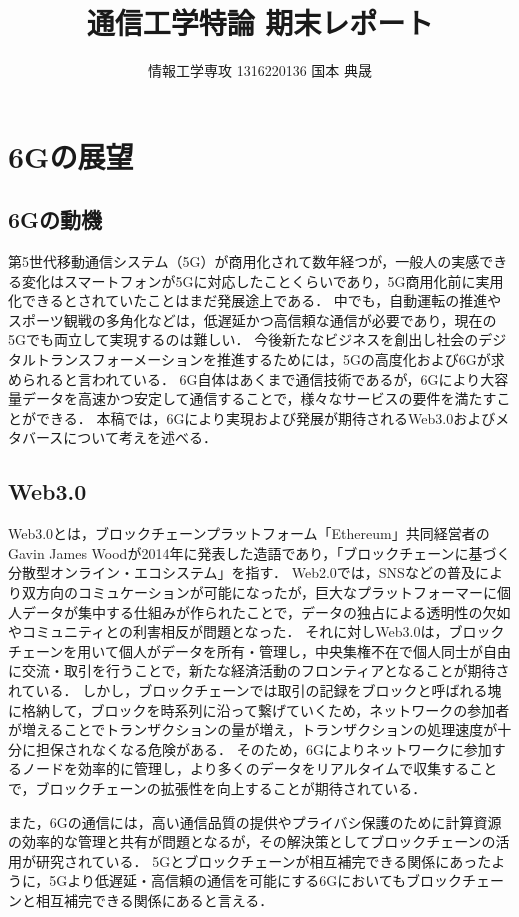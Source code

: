 \documentclass[a4paper,10pt,uplatex]{jsarticle}
\title{通信工学特論 期末レポート}
\author{情報工学専攻 1316220136 国本 典晟}
\date{}
\begin{document}
\maketitle

\section{6Gの展望}
\subsection{6Gの動機}
第5世代移動通信システム（5G）が商用化されて数年経つが，一般人の実感できる変化はスマートフォンが5Gに対応したことくらいであり，5G商用化前に実用化できるとされていたことはまだ発展途上である．
中でも，自動運転の推進やスポーツ観戦の多角化などは，低遅延かつ高信頼な通信が必要であり，現在の5Gでも両立して実現するのは難しい．
今後新たなビジネスを創出し社会のデジタルトランスフォーメーションを推進するためには，5Gの高度化および6Gが求められると言われている\cite{ドコモ,KDDI}．
6G自体はあくまで通信技術であるが，6Gにより大容量データを高速かつ安定して通信することで，様々なサービスの要件を満たすことができる．
本稿では，6Gにより実現および発展が期待されるWeb3.0およびメタバースについて考えを述べる．

\subsection{Web3.0}
Web3.0とは，ブロックチェーンプラットフォーム「Ethereum」共同経営者のGavin James Woodが2014年に発表した造語であり，「ブロックチェーンに基づく分散型オンライン・エコシステム」を指す\cite{Web3.0}．
Web2.0では，SNSなどの普及により双方向のコミュケーションが可能になったが，巨大なプラットフォーマーに個人データが集中する仕組みが作られたことで，データの独占による透明性の欠如やコミュニティとの利害相反が問題となった．
それに対しWeb3.0は，ブロックチェーンを用いて個人がデータを所有・管理し，中央集権不在で個人同士が自由に交流・取引を行うことで，新たな経済活動のフロンティアとなることが期待されている\cite{経産省}．
しかし，ブロックチェーンでは取引の記録をブロックと呼ばれる塊に格納して，ブロックを時系列に沿って繋げていくため，ネットワークの参加者が増えることでトランザクションの量が増え，トランザクションの処理速度が十分に担保されなくなる危険がある．
そのため，6Gによりネットワークに参加するノードを効率的に管理し，より多くのデータをリアルタイムで収集することで，ブロックチェーンの拡張性を向上することが期待されている．\par
また，6Gの通信には，高い通信品質の提供やプライバシ保護のために計算資源の効率的な管理と共有が問題となるが，その解決策としてブロックチェーンの活用が研究されている\cite{資源管理,長谷川}．
5Gとブロックチェーンが相互補完できる関係にあった\cite{ASCII}ように，5Gより低遅延・高信頼の通信を可能にする6Gにおいてもブロックチェーンと相互補完できる関係にあると言える．
\end{document}
